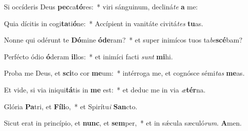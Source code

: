 \item Si occíderis Deus \textbf{pec}ca\textbf{tó}res:~* viri sánguinum, decliná\textit{te} \textbf{a} me:
\item Quia dícitis in cogi\textbf{ta}ti\textbf{ó}ne:~* Accípient in vanitáte civitá\textit{tes} \textbf{tu}as.
\item Nonne qui odérunt te \textbf{Dó}mine \textbf{ó}\textbf{de}ram?~* et super inimícos tuos ta\textit{be}\textbf{scé}bam?
\item Perfécto ódio \textbf{ó}deram \textbf{il}los:~* et inimíci facti \textit{sunt} \textbf{mi}hi.
\item Proba me Deus, et \textbf{sci}to cor \textbf{me}um:~* intérroga me, et cognósce sémi\textit{tas} \textbf{me}as.
\item Et vide, si via iniqui\textbf{tá}tis in \textbf{me} est:~* et deduc me in via \textit{æ}\textbf{tér}na.
\item Glória \textbf{Pa}tri, et \textbf{Fí}\textbf{li}o,~* et Spirítu\textit{i} \textbf{San}cto.
\item Sicut erat in princípio, et \textbf{nunc}, et \textbf{sem}per,~* et in sǽcula sæculó\textit{rum}. \textbf{A}men.
